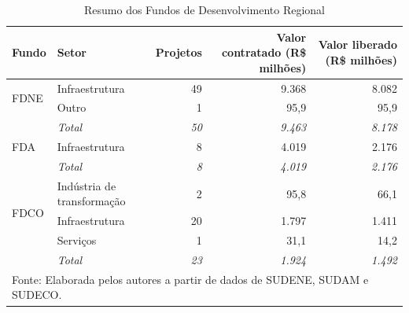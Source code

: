 \begin{table}[htbp]
	\centering
	\caption{Resumo dos Fundos de Desenvolvimento Regional}
	\label{tab:resumo_fd}
	\footnotesize
	\renewcommand{\arraystretch}{1.2}
	\begin{tabular}{llrrr}
		\toprule
		Fundo & Setor & Projetos & \makecell{Valor contratado \\ (R\$ milhões)} & \makecell{Valor liberado \\ (R\$ milhões)} \\
		\midrule
		\multirow{2}{*}{FDNE} & Infraestrutura & 49 & 9.368 & 8.082 \\
		 & Outro & 1 & 95,9 & 95,9 \\
		& \textit{Total} & \textit{50} & \textit{9.463} & \textit{8.178} \\
		\midrule
		\multirow{1}{*}{FDA} & Infraestrutura & 8 & 4.019 & 2.176 \\
		& \textit{Total} & \textit{8} & \textit{4.019} & \textit{2.176} \\
		\midrule
		\multirow{3}{*}{FDCO} & Indústria de transformação & 2 & 95,8 & 66,1 \\
		 & Infraestrutura & 20 & 1.797 & 1.411 \\
		 & Serviços & 1 & 31,1 & 14,2 \\
		& \textit{Total} & \textit{23} & \textit{1.924} & \textit{1.492} \\
		\bottomrule
		\multicolumn{5}{l}{\footnotesize Fonte: Elaborada pelos autores a partir de dados de SUDENE, SUDAM e SUDECO.} \\
	\end{tabular}
\end{table}